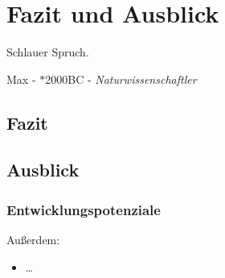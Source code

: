 \chapter{Fazit und Ausblick}
\label{cha:fazit_ausblick}
\epigraph{Schlauer Spruch.}{Max  - $\ast$2000BC - \textit{Naturwissenschaftler}}




\section{Fazit}
\label{sec:fazit}
\blindtext

\blindtext



\section{Ausblick}
\label{sec:ausblick}
\blindtext



\subsection{Entwicklungspotenziale}
\label{ssec:future-work}
Außerdem:

\begin{itemize}
	\item \dots
\end{itemize}
